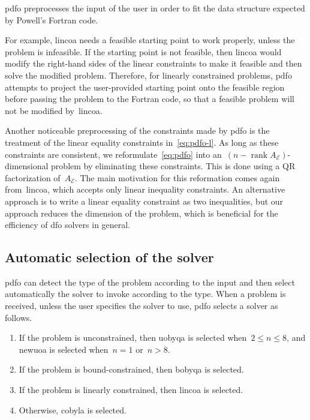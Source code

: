 \documentclass[
    smallextended,  %
    final,        %
]{svjour3}
\DeclareMathOperator\rank{rank}
\newcommand{\aeq}{A_{\scriptscriptstyle\mathcal{E}}}
\begin{document}
\gls{pdfo} preprocesses the input of the user in order to fit the data structure expected by
Powell's Fortran code.

For example, \gls{lincoa} needs a feasible starting point to work properly, unless the problem is
infeasible. If the starting point is not feasible, then \gls{lincoa} would modify the right-hand
sides of the linear constraints to make it feasible and then solve the modified problem.
Therefore, for linearly constrained problems, \gls{pdfo} attempts to project the user-provided
starting point onto the feasible region before passing the problem to the Fortran code, so that
a feasible problem will not be modified by~\gls{lincoa}.

Another noticeable preprocessing of the constraints made by \gls{pdfo} is the treatment of the
linear equality constraints in~\eqref{eq:pdfo-l}.
As long as these constraints are consistent, we reformulate~\eqref{eq:pdfo} into
an~$(n - \rank \aeq)$-dimensional problem by eliminating these constraints.  This is done using a
QR factorization of~$\aeq$. The main motivation for this reformation comes again from~\gls{lincoa},
which accepts only linear inequality constraints. An alternative approach is to write a linear
equality constraint as two inequalities, but our approach reduces the dimension of the problem,
which is beneficial for the efficiency of \gls{dfo} solvers in general.


\subsection{Automatic selection of the solver}
\label{subsec:solver-selection}

\gls{pdfo} can detect the type of the problem according to the input and then select automatically
the solver to invoke according to the type.
When a problem is received, unless the user specifies the solver to use, \gls{pdfo} selects a solver as follows.
\begin{enumerate}
    \item If the problem is unconstrained, then \gls{uobyqa} is selected when~$2 \le n \le 8$, and \gls{newuoa} is selected when~$n = 1$ or~$n > 8$.
    \item If the problem is bound-constrained, then \gls{bobyqa} is selected.
    \item If the problem is linearly constrained, then \gls{lincoa} is selected.
    \item Otherwise, \gls{cobyla} is selected.
\end{enumerate}
\end{document}
